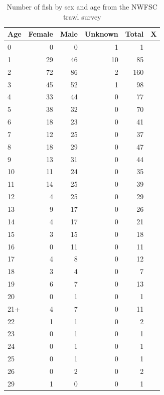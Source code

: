 \documentclass[12pt,]{article}
\begin{document}
\begin{table}[ht]
\centering
\caption{Number of fish by sex and age from the NWFSC trawl survey} 
\label{tab:sex_ratio}
\begin{tabular}{lrrrrl}
  \hline
Age & Female & Male & Unknown & Total & X \\ 
  \hline
0 &   0 &   0 &   1 &   1 &  \\ 
  1 &  29 &  46 &  10 &  85 &  \\ 
  2 &  72 &  86 &   2 & 160 &  \\ 
  3 &  45 &  52 &   1 &  98 &  \\ 
  4 &  33 &  44 &   0 &  77 &  \\ 
  5 &  38 &  32 &   0 &  70 &  \\ 
  6 &  18 &  23 &   0 &  41 &  \\ 
  7 &  12 &  25 &   0 &  37 &  \\ 
  8 &  18 &  29 &   0 &  47 &  \\ 
  9 &  13 &  31 &   0 &  44 &  \\ 
  10 &  11 &  24 &   0 &  35 &  \\ 
  11 &  14 &  25 &   0 &  39 &  \\ 
  12 &   4 &  25 &   0 &  29 &  \\ 
  13 &   9 &  17 &   0 &  26 &  \\ 
  14 &   4 &  17 &   0 &  21 &  \\ 
  15 &   3 &  15 &   0 &  18 &  \\ 
  16 &   0 &  11 &   0 &  11 &  \\ 
  17 &   4 &   8 &   0 &  12 &  \\ 
  18 &   3 &   4 &   0 &   7 &  \\ 
  19 &   6 &   7 &   0 &  13 &  \\ 
  20 &   0 &   1 &   0 &   1 &  \\ 
  21+ &   4 &   7 &   0 &  11 &  \\ 
  22 &   1 &   1 &   0 &   2 &  \\ 
  23 &   0 &   1 &   0 &   1 &  \\ 
  24 &   0 &   1 &   0 &   1 &  \\ 
  25 &   0 &   1 &   0 &   1 &  \\ 
  26 &   0 &   2 &   0 &   2 &  \\ 
  29 &   1 &   0 &   0 &   1 &  \\ 
   \hline
\end{tabular}
\end{table}
\end{document}
